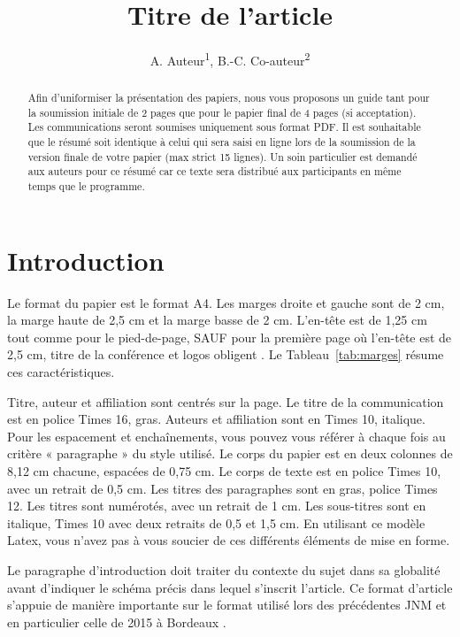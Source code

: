 \documentclass{jnm}
\title{Titre de l'article}
\author{A. Auteur\textsuperscript{1}, B.-C. Co-auteur\textsuperscript{2}}
\institute{\textsuperscript{1}Laboratoire XLIM, 123 avenue Albert Thomas, 87060 \\\textsuperscript{2}Université de Limoges, 33 rue François Mitterrand, 87032 Limoges\\}
\begin{document}
\maketitle

\begin{abstract}
Afin d'uniformiser la présentation des papiers, nous vous proposons un guide tant pour la soumission initiale de 2 pages que pour le papier final de 4 pages (si acceptation). Les communications seront soumises uniquement sous format PDF. Il est souhaitable que le résumé soit identique à celui qui sera saisi en ligne lors de la soumission de la version finale de votre papier (max strict 15 lignes). Un soin particulier est demandé aux auteurs pour ce résumé car ce texte sera distribué aux participants en même temps que le programme.
\end{abstract}


\section{Introduction}
Le format du papier est le format A4. Les marges droite et gauche sont de 2 cm, la marge haute de 2,5 cm et la marge basse de 2 cm. L'en-tête est de 1,25 cm tout comme pour le pied-de-page, SAUF pour la première page où l'en-tête est de 2,5 cm, \og titre de la conférence et logos obligent \fg. Le Tableau~\ref{tab:marges} résume ces caractéristiques.

Titre, auteur et affiliation sont centrés sur la page. Le titre de la communication est en police Times 16, gras. Auteurs et affiliation sont en Times 10, italique. Pour les espacement et enchaînements, vous pouvez vous référer à chaque fois au critère « paragraphe » du style utilisé. Le corps du papier est en deux colonnes de 8,12 cm chacune, espacées de 0,75 cm. Le corps de texte est en police Times 10, avec un retrait de 0,5 cm. Les titres des paragraphes sont en gras, police Times 12. Les titres sont numérotés, avec un retrait de 1 cm. Les sous-titres sont en italique, Times 10 avec deux retraits de 0,5 et 1,5 cm. En utilisant ce modèle Latex, vous n'avez pas à vous soucier de ces différents éléments de mise en forme.

Le paragraphe d'introduction doit traiter du contexte du sujet dans sa globalité avant d'indiquer le schéma précis dans lequel s'inscrit l'article. Ce format d'article s'appuie de manière importante sur le format utilisé lors des précédentes JNM et en particulier celle de 2015 à Bordeaux \cite{kerherve}.
\end{document}
